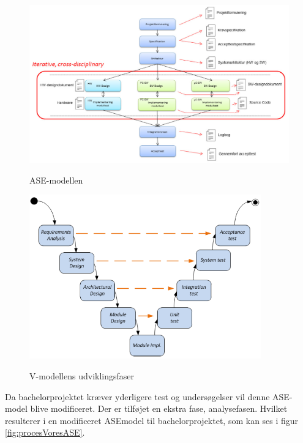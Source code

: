 \begin{figure}[H]
\centering
{\includegraphics[width=\textwidth]
{Figure/asemodel}}
\caption{ASE-modellen\cite{IngeniorhojskolenAarhusUniversiteta}}
\label{fig:asemodel}
\end{figure}

\begin{figure}[H]
\centering
{\includegraphics[width=10cm]
{Figure/vmodel}}
\caption{V-modellens udviklingsfaser\cite{IngeniorhojskolenAarhusUniversiteta}}
\label{fig:vmodel}
\end{figure}



Da bachelorprojektet kræver yderligere test og undersøgelser vil denne ASE-model blive modificeret. Der er tilføjet en ekstra fase, analysefasen. Hvilket resulterer i en modificeret ASEmodel
til bachelorprojektet, som kan ses i figur \ref{fig:procesVoresASE}.

